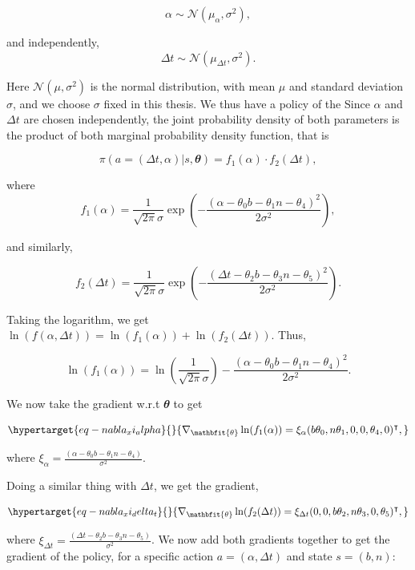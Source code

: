\documentclass[
  letterpaper,
]{report}
\theoremstyle{plain}
\theoremstyle{definition}
\theoremstyle{definition}
\theoremstyle{remark}
\begin{document}
\[
\alpha \sim  \mathcal{N}(\mu_\alpha,\sigma^2),
\]

and independently, \[
\Delta t \sim  \mathcal{N}(\mu_{\Delta t}, \sigma^2).
\]

Here \(\mathcal{N}(\mu,\sigma^2)\) is the normal distribution, with mean
\(\mu\) and standard deviation \(\sigma\), and we choose \(\sigma\)
fixed in this thesis. We thus have a policy of the Since \(\alpha\) and
\(\Delta t\) are chosen independently, the joint probability density of
both parameters is the product of both marginal probability density
function, that is

\[
\pi(a = (\Delta t, \alpha)|s,\mathbfit{\theta})  = f_{1}(\alpha)\cdot f_{2}(\Delta t),
\]

where \[
f_1(\alpha) = \frac{1}{\sqrt{2\pi}\sigma}\exp\left(-\frac{(\alpha - \theta_0b-\theta_1n-\theta_4)^2}{2\sigma^2}\right),
\]

and similarly,

\[
f_2(\Delta t) = \frac{1}{\sqrt{2\pi}\sigma}\exp\left(-\frac{(\Delta t - \theta_2b-\theta_3n-\theta_5)^2}{2\sigma^2}\right).
\]

Taking the logarithm, we get
\(\ln(f(\alpha,\Delta t)) = \ln(f_1(\alpha)) + \ln(f_2(\Delta t))\).
Thus,

\[
\ln(f_1(\alpha)) = \ln(\frac{1}{\sqrt{2\pi}\sigma}) - \frac{(\alpha - \theta_0b-\theta_1n-\theta_4)^2}{2\sigma^2}.
\]

We now take the gradient w.r.t \(\mathbfit{\theta}\) to get

\begin{equation}\protect\hypertarget{eq-nabla_xi_alpha}{}{
\nabla_{\mathbfit{\theta}} \ln(f_1(\alpha)) = \xi_\alpha (b\theta_0,n\theta_1,0,0,\theta_4,0)^\intercal,
}\label{eq-nabla_xi_alpha}\end{equation}

where
\(\xi_\alpha = \frac{(\alpha - \theta_0b-\theta_1n-\theta_4)}{\sigma^2}\).

Doing a similar thing with \(\Delta t\), we get the gradient,

\begin{equation}\protect\hypertarget{eq-nabla_xi_delta_t}{}{
\nabla_{\mathbfit{\theta}} \ln(f_2(\Delta t)) = \xi_{\Delta t}(0,0,b\theta_2,n\theta_3,0,\theta_5)^\intercal,
}\label{eq-nabla_xi_delta_t}\end{equation}

where
\(\xi_{\Delta t} = \frac{(\Delta t - \theta_2b-\theta_3n-\theta_5)}{\sigma^2}\).
We now add both gradients together to get the gradient of the policy,
for a specific action \(a = (\alpha, \Delta t)\) and state \(s=(b,n)\):
\end{document}
